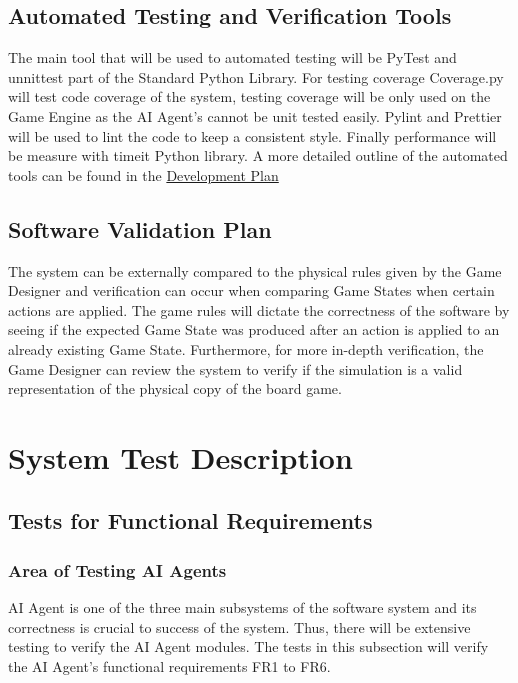 \documentclass[12pt, titlepage]{article}
\begin{document}
\subsection{Automated Testing and Verification Tools}
The main tool that will be used to automated testing will be PyTest and unnittest part of the Standard Python Library. For testing coverage Coverage.py will test code coverage of the system, testing coverage will be only used on the Game Engine as the AI Agent's cannot be unit tested easily. Pylint and Prettier will be used to lint the code to keep a consistent style. Finally performance will be measure with timeit Python library. A more detailed outline of the automated tools can be found in the \href{https://github.com/Dorps/aiboardgame/blob/main/docs/DevelopmentPlan/DevelopmentPlan.pdf}{Development Plan} 


\subsection{Software Validation Plan}

 The system can be externally compared to the physical rules given by the Game Designer and verification can occur when comparing Game States when certain actions are applied. The game rules will dictate the correctness of the software by seeing if the expected Game State was produced after an action is applied to an already existing Game State. Furthermore, for more in-depth verification, the Game Designer can review the system to verify if the simulation is a valid representation of the physical copy of the board game.



\section{System Test Description}
	
\subsection{Tests for Functional Requirements}

\subsubsection{Area of Testing AI Agents}
AI Agent is one of the three main subsystems of the software system and its correctness is crucial to success of the system. Thus, there will be extensive testing to verify the AI Agent modules. The tests in this subsection will verify the AI Agent's functional requirements FR1 to FR6.\\\\
	
\end{document}
